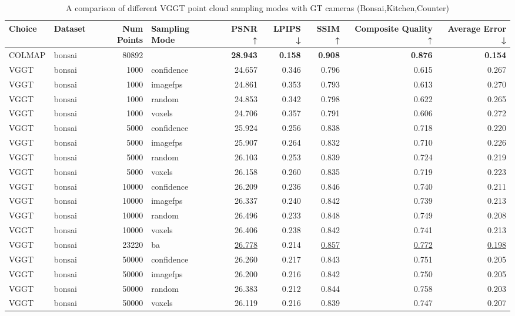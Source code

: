 \begin{table}[H]
\caption{A comparison of different VGGT point cloud sampling modes with GT cameras (Bonsai,Kitchen,Counter)}
\label{tab:03_sampling_mode_gt_cams_bonsai,kitchen,counter}
\small
\begin{tabular}{llrlrrrrr}
\toprule
Choice & Dataset & Num Points & Sampling Mode & PSNR ↑ & LPIPS ↓ & SSIM ↑ & Composite Quality ↑ & Average Error ↓ \\
\midrule
COLMAP & bonsai & 80892 &  & \textbf{28.943} & \textbf{0.158} & \textbf{0.908} & \textbf{0.876} & \textbf{0.154} \\
VGGT & bonsai & 1000 & confidence & 24.657 & 0.346 & 0.796 & 0.615 & 0.267 \\
VGGT & bonsai & 1000 & imagefps & 24.861 & 0.353 & 0.793 & 0.613 & 0.270 \\
VGGT & bonsai & 1000 & random & 24.853 & 0.342 & 0.798 & 0.622 & 0.265 \\
VGGT & bonsai & 1000 & voxels & 24.706 & 0.357 & 0.791 & 0.606 & 0.272 \\
VGGT & bonsai & 5000 & confidence & 25.924 & 0.256 & 0.838 & 0.718 & 0.220 \\
VGGT & bonsai & 5000 & imagefps & 25.907 & 0.264 & 0.832 & 0.710 & 0.226 \\
VGGT & bonsai & 5000 & random & 26.103 & 0.253 & 0.839 & 0.724 & 0.219 \\
VGGT & bonsai & 5000 & voxels & 26.158 & 0.260 & 0.835 & 0.719 & 0.223 \\
VGGT & bonsai & 10000 & confidence & 26.209 & 0.236 & 0.846 & 0.740 & 0.211 \\
VGGT & bonsai & 10000 & imagefps & 26.337 & 0.240 & 0.842 & 0.739 & 0.213 \\
VGGT & bonsai & 10000 & random & 26.496 & 0.233 & 0.848 & 0.749 & 0.208 \\
VGGT & bonsai & 10000 & voxels & 26.406 & 0.238 & 0.842 & 0.741 & 0.213 \\
VGGT & bonsai & 23220 & ba & \underline{26.778} & 0.214 & \underline{0.857} & \underline{0.772} & \underline{0.198} \\
VGGT & bonsai & 50000 & confidence & 26.260 & 0.217 & 0.843 & 0.751 & 0.205 \\
VGGT & bonsai & 50000 & imagefps & 26.200 & 0.216 & 0.842 & 0.750 & 0.205 \\
VGGT & bonsai & 50000 & random & 26.383 & 0.212 & 0.844 & 0.758 & 0.203 \\
VGGT & bonsai & 50000 & voxels & 26.119 & 0.216 & 0.839 & 0.747 & 0.207 \\

\end{tabular}
\end{table}
